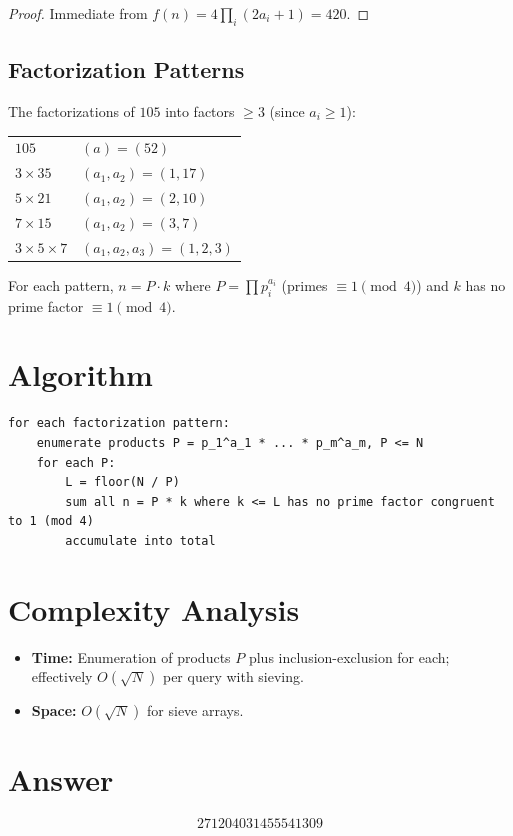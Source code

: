 \documentclass[12pt]{article}
\begin{document}
\begin{proof}
Immediate from $f(n) = 4\prod_i(2a_i+1) = 420$.
\end{proof}

\subsection{Factorization Patterns}

The factorizations of $105$ into factors $\geq 3$ (since $a_i \geq 1$):
\begin{center}
\begin{tabular}{ll}
$105$ & $(a) = (52)$ \\
$3 \times 35$ & $(a_1, a_2) = (1, 17)$ \\
$5 \times 21$ & $(a_1, a_2) = (2, 10)$ \\
$7 \times 15$ & $(a_1, a_2) = (3, 7)$ \\
$3 \times 5 \times 7$ & $(a_1, a_2, a_3) = (1, 2, 3)$
\end{tabular}
\end{center}

For each pattern, $n = P \cdot k$ where $P = \prod p_i^{a_i}$ (primes $\equiv 1\pmod{4}$) and $k$ has no prime factor $\equiv 1\pmod{4}$.

\section{Algorithm}

\begin{verbatim}
for each factorization pattern:
    enumerate products P = p_1^a_1 * ... * p_m^a_m, P <= N
    for each P:
        L = floor(N / P)
        sum all n = P * k where k <= L has no prime factor congruent to 1 (mod 4)
        accumulate into total
\end{verbatim}

\section{Complexity Analysis}
\begin{itemize}
    \item \textbf{Time:} Enumeration of products $P$ plus inclusion-exclusion for each; effectively $O(\sqrt{N})$ per query with sieving.
    \item \textbf{Space:} $O(\sqrt{N})$ for sieve arrays.
\end{itemize}

\section{Answer}

\[
\boxed{271204031455541309}
\]
\end{document}
